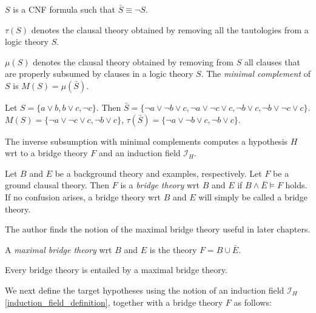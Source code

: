 \begin{remark}
$S$ is a CNF formula such that $\bar{S} \equiv \neg S$.
\end{remark}

\begin{defn}
\emph{$\tau(S)$} denotes the clausal theory obtained by removing all the tautologies from a logic theory $S$.
\end{defn}

\begin{defn}
\emph{$\mu(S)$} denotes the clausal theory obtained by removing from $S$ all clauses that are properly subsumed by clauses in a logic theory $S$.
The \emph{minimal complement} of $S$ is $M(S)=\mu(\bar{S})$.
\end{defn}

\begin{exmp}
Let $S=\{a \lor b, b \lor c, \neg c\}$. Then
$\bar{S}=\{\neg a \lor \neg b \lor c, \neg a \lor \neg c \lor c, \neg b \lor c, \neg b \lor \neg c \lor c\}$.
$M(S)=\{\neg a \lor \neg c \lor c, \neg b \lor c\}$,
$\tau(\bar{S})=\{\neg a \lor \neg b \lor c, \neg b \lor c\}$.
\end{exmp}

The inverse subsumption with minimal complements computes a hypothesis $H$ wrt to a bridge theory $F$ and an induction field $\mathcal{I}_H$.

\begin{defn}\label{definition_bridge_theory}
Let $B$ and $E$ be a background theory and examples, respectively.
Let $F$ be a ground clausal theory. Then $F$ is a \emph{bridge theory} wrt $B$ and $E$ if
$B \land \bar{E} \models F$ holds. If no confusion arises, a bridge theory wrt $B$ and $E$ will simply be called a bridge theory.
\end{defn}

The author finds the notion of the maximal bridge theory useful in later chapters.
\begin{defn}\label{maximal_bridge_theory_definition}
A \emph{maximal bridge theory} wrt $B$ and $E$ is the theory $F = B \cup \bar{E}$.
\end{defn}
\begin{remark}
Every bridge theory is entailed by a maximal bridge theory.
\end{remark}

We next define the target hypotheses using the notion of an induction field $\mathcal{I}_H$\ref{induction_field_definition}, together with a bridge theory $F$ as follows:

